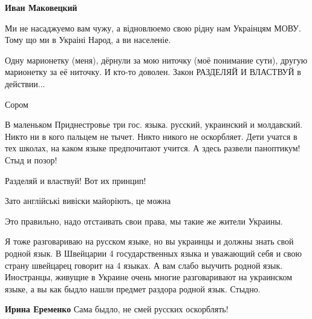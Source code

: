 \begin{itemize}
\begin{itemize}
\textbf{Иван Маковецкий} 

Ми не насаджуемо вам чужу, а відновлюемо свою рідну нам Украінцям МОВУ. Тому що
ми в Украіні Народ, а ви населеніе.



Одну марионетку (меня), дёрнули за мою ниточку (моё понимание сути), другую
марионетку за её ниточку. И кто-то доволен. Закон РАЗДЕЛЯЙ И ВЛАСТВУЙ в
действии...

\end{itemize}

Сором


В маленьком Приднестровье три гос. языка. русский, украинский и молдавский.
Никто ни в кого пальцем не тычет. Никто никого не оскорбляет. Дети учатся в тех
школах, на каком языке предпочитают учится. А здесь развели паноптикум! Стыд и
позор!

Разделяй и властвуй! Вот их принцип!

Зато англійські вивіски майоріють, це можна

Это правильно, надо отстаивать свои права, мы такие же жители Украины.


Я тоже разговариваю на русском языке, но вы украинцы и должны знать свой родной
язык. В Швейцарии 4 государственных языка и уважающий себя и свою страну
швейцарец говорит на 4 языках. А вам слабо выучить родной язык. Иностранцы,
живущие в Украине очень многие разговаривают на украинском языке, а вы как
быдло нашли предмет раздора родной язык. Стыдно.

\begin{itemize}
\textbf{Ирина Еременко} Сама быдло, не смей русских оскорблять!


\end{itemize}
\end{itemize}
